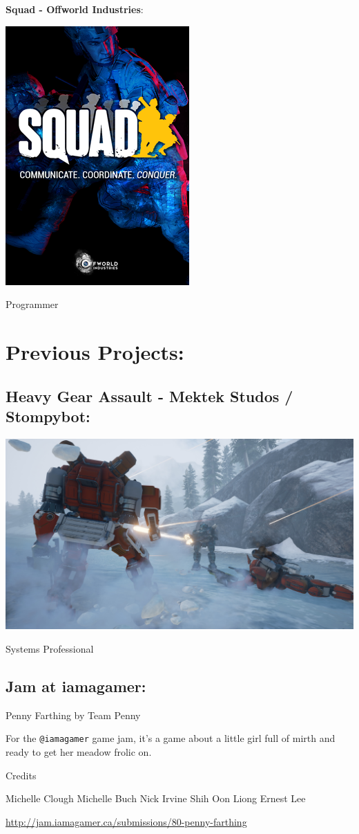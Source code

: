\documentclass[]{book}
\begin{document}
\textbf{Squad - Offworld Industries}:

\includegraphics{Image/Squad_(videogame)_2016_frontcover.png}

Programmer

\section{Previous Projects:}\label{previous-projects}

\subsection{Heavy Gear Assault - Mektek Studos /
Stompybot:}\label{heavy-gear-assault---mektek-studos-stompybot}

\includegraphics{Image/HeavyGearAssaultPromoImage.jpg}

Systems Professional

\subsection{Jam at iamagamer:}\label{jam-at-iamagamer}

Penny Farthing by Team Penny

For the \texttt{@iamagamer} game jam, it's a game about a little girl
full of mirth and ready to get her meadow frolic on.

Credits

Michelle Clough Michelle Buch Nick Irvine Shih Oon Liong Ernest Lee

\url{http://jam.iamagamer.ca/submissions/80-penny-farthing}


\end{document}
